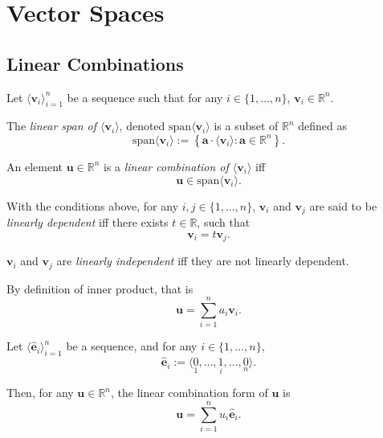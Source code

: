 
\chapter{Vector Spaces}


\section{Linear Combinations}


\begin{definition}
	\label{def: span and linear combination}
	Let $\langle\mathbf v_i\rangle_{i = 1}^n$ be a sequence such that for any $i \in \{1, \ldots, n\}$, $\mathbf v_i \in \mathbb R^n$.
	
	The \textit{linear span of $\langle \mathbf v_i\rangle$}, denoted $\mathrm{span}\langle \mathbf v_i\rangle$ is a subset of $\mathbb R^n$ defined as
	$$
	\mathrm{span}\langle \mathbf v_i\rangle := \left\{ \mathbf a \cdot \langle \mathbf v_i \rangle : \mathbf a \in \mathbb R^n \right\}.
	$$
	
	An element $\mathbf u \in \mathbb R^n$ is a \textit{linear combination of $\langle \mathbf v_i \rangle$} iff
	$$
	\mathbf u \in \mathrm{span} \langle \mathbf v_i \rangle.
	$$
\end{definition}


\begin{definition}
	\label{def: linear dependency}
	With the conditions above, for any $i,j \in \{1, \ldots, n\}$, $\mathbf v_i$ and $\mathbf v_j$ are said to be \textit{linearly dependent} iff there exists $t \in \mathbb R$, such that
	$$
	\mathbf v_i = t \mathbf v_j.
	$$
	
	$\mathbf v_i$ and $\mathbf v_j$ are \textit{linearly independent} iff they are not linearly dependent.
\end{definition}


\begin{note}
	By definition of inner product, that is
	$$
	\mathbf u = \sum_{i = 1}^n a_i \mathbf v_i.
	$$
\end{note}



\begin{note}
	Let $\langle \mathbf{\hat e}_i \rangle_{i = 1}^n$ be a sequence, and for any $i \in \{1, \ldots, n\}$,
	$$
	\mathbf{\hat e}_i := \langle \underset{1}{0}, \ldots, \underset{i}{1}, \ldots, \underset{n}{0} \rangle.
	$$
	
	Then, for any $\mathbf u \in \mathbb R^n$, the linear combination form of $\mathbf u$ is
	$$
	\mathbf u = \sum_{i = 1}^n u_i \mathbf{\hat e}_i.
	$$
\end{note}



